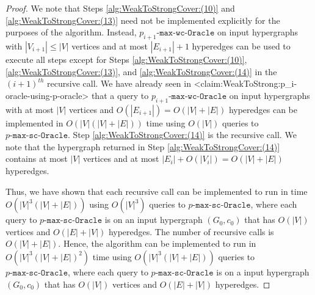 \documentclass{article}
\def\Cref#1{<#1>}%
\newcommand{\functionMaximizationOracle}[1]{\ensuremath{{#1}\text{-}\mathtt{max}\text{-}\mathtt{wc}\text{-}\mathtt{Oracle}}\xspace}
\newcommand{\functionMaximizationOracleStrongCover}[1]{\ensuremath{{#1}\text{-}\mathtt{max}\text{-}\mathtt{sc}\text{-}\mathtt{Oracle}}\xspace}
\begin{document}
\begin{proof}
We note that Steps \ref{alg:WeakToStrongCover:(10)} and \ref{alg:WeakToStrongCover:(13)} need not be implemented explicitly for the purposes of the algorithm. Instead, \functionMaximizationOracle{p_{i+1}} on input hypergraphs with $|V_{i+1}|\le |V|$ vertices and at most $|E_{i+1}|+1$ hyperedges can be used to execute all steps except for Steps \ref{alg:WeakToStrongCover:(10)}, \ref{alg:WeakToStrongCover:(13)}, and \ref{alg:WeakToStrongCover:(14)} in the $(i+1)^{th}$ recursive call. 
We have already seen in \Cref{claim:WeakToStrong:p_i-oracle-using-p-oracle} that a query to \functionMaximizationOracle{p_{i+1}} on input hypergraphs with at most $|V|$ vertices and $O(|E_{i+1}|) = O(|V| + |E|)$ hyperedges can be implemented in  $O(|V|(|V|+|E|))$ time using $O(|V|)$ queries to \functionMaximizationOracleStrongCover{p}. 
Step \ref{alg:WeakToStrongCover:(14)} is the recursive call. We note that the hypergraph returned in Step \ref{alg:WeakToStrongCover:(14)} contains at most $|V|$ vertices and at most $|E_i| + O(|V_i|)= O(|V| + |E|)$ hyperedges. 

Thus, we have shown that each recursive call can be implemented to run in time $O(|V|^3(|V| + |E|))$ using $O(|V|^3)$ queries to \functionMaximizationOracleStrongCover{p}, where each query to \functionMaximizationOracleStrongCover{p} is on an input hypergraph $(G_0, c_0)$ that has $O(|V|)$ vertices and $O(|E|+|V|)$ hyperedges. The number of recursive calls is $O(|V|+|E|)$. 
Hence, the algorithm can be implemented to run in $O(|V|^3(|V| + |E|)^2)$ time using $O(|V|^3(|V|+|E|))$ queries to \functionMaximizationOracleStrongCover{p}, where each query to \functionMaximizationOracleStrongCover{p} is on a input hypergraph $(G_0, c_0)$ that has $O(|V|)$ vertices and $O(|E|+|V|)$ hyperedges. 
\end{proof}
\end{document}
